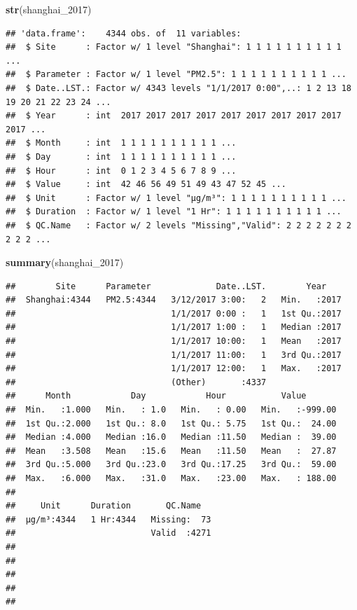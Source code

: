 \documentclass[12pt,]{article}
\newenvironment{Shaded}{\begin{snugshade}}{\end{snugshade}}
\newcommand{\KeywordTok}[1]{\textcolor[rgb]{0.13,0.29,0.53}{\textbf{#1}}}
\newcommand{\DecValTok}[1]{\textcolor[rgb]{0.00,0.00,0.81}{#1}}
\newcommand{\NormalTok}[1]{#1}
\begin{document}
\begin{Shaded}
\begin{Highlighting}[]
\KeywordTok{str}\NormalTok{(shanghai_}\DecValTok{2017}\NormalTok{)}
\end{Highlighting}
\end{Shaded}

\begin{verbatim}
## 'data.frame':    4344 obs. of  11 variables:
##  $ Site      : Factor w/ 1 level "Shanghai": 1 1 1 1 1 1 1 1 1 1 ...
##  $ Parameter : Factor w/ 1 level "PM2.5": 1 1 1 1 1 1 1 1 1 1 ...
##  $ Date..LST.: Factor w/ 4343 levels "1/1/2017 0:00",..: 1 2 13 18 19 20 21 22 23 24 ...
##  $ Year      : int  2017 2017 2017 2017 2017 2017 2017 2017 2017 2017 ...
##  $ Month     : int  1 1 1 1 1 1 1 1 1 1 ...
##  $ Day       : int  1 1 1 1 1 1 1 1 1 1 ...
##  $ Hour      : int  0 1 2 3 4 5 6 7 8 9 ...
##  $ Value     : int  42 46 56 49 51 49 43 47 52 45 ...
##  $ Unit      : Factor w/ 1 level "µg/m³": 1 1 1 1 1 1 1 1 1 1 ...
##  $ Duration  : Factor w/ 1 level "1 Hr": 1 1 1 1 1 1 1 1 1 1 ...
##  $ QC.Name   : Factor w/ 2 levels "Missing","Valid": 2 2 2 2 2 2 2 2 2 2 ...
\end{verbatim}

\begin{Shaded}
\begin{Highlighting}[]
\KeywordTok{summary}\NormalTok{(shanghai_}\DecValTok{2017}\NormalTok{)}
\end{Highlighting}
\end{Shaded}

\begin{verbatim}
##        Site      Parameter             Date..LST.        Year     
##  Shanghai:4344   PM2.5:4344   3/12/2017 3:00:   2   Min.   :2017  
##                               1/1/2017 0:00 :   1   1st Qu.:2017  
##                               1/1/2017 1:00 :   1   Median :2017  
##                               1/1/2017 10:00:   1   Mean   :2017  
##                               1/1/2017 11:00:   1   3rd Qu.:2017  
##                               1/1/2017 12:00:   1   Max.   :2017  
##                               (Other)       :4337                 
##      Month            Day            Hour           Value        
##  Min.   :1.000   Min.   : 1.0   Min.   : 0.00   Min.   :-999.00  
##  1st Qu.:2.000   1st Qu.: 8.0   1st Qu.: 5.75   1st Qu.:  24.00  
##  Median :4.000   Median :16.0   Median :11.50   Median :  39.00  
##  Mean   :3.508   Mean   :15.6   Mean   :11.50   Mean   :  27.87  
##  3rd Qu.:5.000   3rd Qu.:23.0   3rd Qu.:17.25   3rd Qu.:  59.00  
##  Max.   :6.000   Max.   :31.0   Max.   :23.00   Max.   : 188.00  
##                                                                  
##     Unit      Duration       QC.Name    
##  µg/m³:4344   1 Hr:4344   Missing:  73  
##                           Valid  :4271  
##                                         
##                                         
##                                         
##                                         
## 
\end{verbatim}
\end{document}
